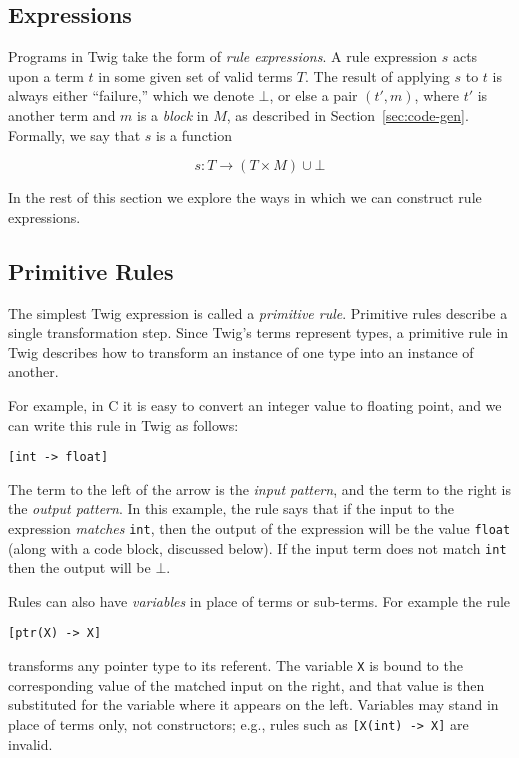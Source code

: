 \subsection{Expressions}

Programs in Twig take the form of \emph{rule expressions}. A rule expression $s$ acts upon a term $t$ in some given set of valid terms $T$. The result of applying $s$ to $t$ is always either ``failure,'' which we denote $\bot$, or else a pair $(t',m)$, where $t'$ is another term and $m$ is a \emph{block} in $M$, as described in Section~\ref{sec:code-gen}. Formally, we say that $s$ is a function

\[
s : T \to (T \times M) \cup \bot
\]

In the rest of this section we explore the ways in which we can construct rule expressions.

\subsection{Primitive Rules}

The simplest Twig expression is called a \emph{primitive rule}.  Primitive rules describe a single transformation step. Since Twig's terms represent types, a primitive rule in Twig describes how to transform an instance of one type into an instance of another.

For example, in C it is easy to convert an integer value to floating point, and we can write this rule in Twig as follows:

\begin{verbatim}
[int -> float]
\end{verbatim}

The term to the left of the arrow is the \emph{input pattern}, and the term to the right is the \emph{output pattern}. In this example, the rule says that if the input to the expression \emph{matches} \texttt{int}, then the output of the expression will be the value \texttt{float} (along with a code block, discussed below). If the input term does not match \texttt{int} then the output will be $\bot$.

Rules can also have \emph{variables} in place of terms or sub-terms. For example the rule

\begin{verbatim}
[ptr(X) -> X]
\end{verbatim}

transforms any pointer type to its referent. The variable \texttt{X} is bound to the corresponding value of the matched input on the right, and that value is then substituted for the variable where it appears on the left. Variables may stand in place of terms only, not constructors; e.g., rules such as \texttt{[X(int) -> X]} are invalid.

